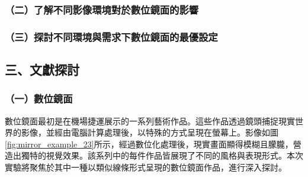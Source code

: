 \documentclass[12pt]{article}
\begin{document}
\subsubsection{（二）了解不同影像環境對於數位鏡面的影響}
\subsubsection{（三）探討不同環境與需求下數位鏡面的最優設定}

\newpage

\subsection{三、文獻探討}

\subsubsection{（一）數位鏡面}

數位鏡面最初是\textcite{husart}在機場捷運展示的一系列藝術作品。這些作品透過鏡頭捕捉現實世界的影像，並經由電腦計算處理後，以特殊的方式呈現在螢幕上。影像如圖\ref{fig:mirror_example_23}所示，經過數位化處理後，現實畫面顯得模糊且朦朧，營造出獨特的視覺效果。該系列中的每件作品皆展現了不同的風格與表現形式。本次實驗將聚焦於其中一種以類似線條形式呈現的數位鏡面作品，進行深入探討。
\end{document}
